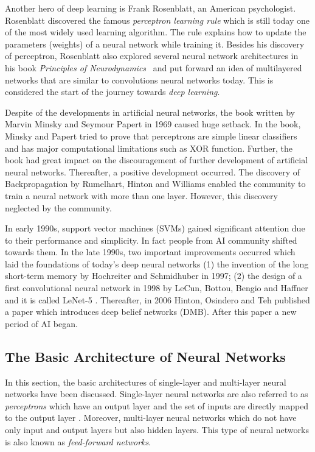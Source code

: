 Another hero of deep learning is Frank Rosenblatt, an American psychologist. Rosenblatt discovered the famous \textit{perceptron learning rule} which is still today one of the most widely used learning algorithm. The rule explains how to update the parameters (weights) of a neural network while training it. Besides his discovery of perceptron,  Rosenblatt also explored several neural network architectures in his book \textit{Principles of Neurodynamics}~\cite{} and
put forward an idea of multilayered networks that are similar to convolutions neural networks today. This is considered the start of the journey towards \textit{deep learning}. 

Despite of the developments in artificial neural networks,  the book written by Marvin Minsky and Seymour Papert in 1969 caused huge setback. In the book, Minsky and Papert tried to prove that perceptrons are simple linear classifiers and has major computational limitations such as XOR function. Further, the book had great impact on the discouragement of further development of artificial neural networks. Thereafter,  a positive development occurred. The discovery of Backpropagation by Rumelhart, Hinton and Williams enabled the community to train a neural network with more than one layer. However, this discovery neglected by the community. 

In early 1990s, support vector machines (SVMs) gained significant attention due to their performance and simplicity. In fact people from AI community shifted towards them. In the late 1990s, two important improvements occurred which laid the foundations of today's deep neural networks (1) the invention of the long short-term memory by Hochreiter and Schmidhuber in 1997; (2) the design of a first convolutional neural network in 1998 by LeCun, Bottou, Bengio and Haffner and it is called LeNet-5 . Thereafter, in 2006 Hinton, Osindero and Teh published a paper which introduces deep belief networks (DMB). After this paper a new period of AI began.
\subsection{The Basic Architecture of Neural Networks} 
In this section, the basic architectures of single-layer and multi-layer neural networks have been discussed. Single-layer neural networks are also referred to as \textit{perceptrons} which have an output layer and the set of inputs are directly mapped to the output layer%
. Moreover, multi-layer neural networks which do not have only input and output layers but also hidden layers. This type of neural networks is also known as \textit{feed-forward networks}. 
